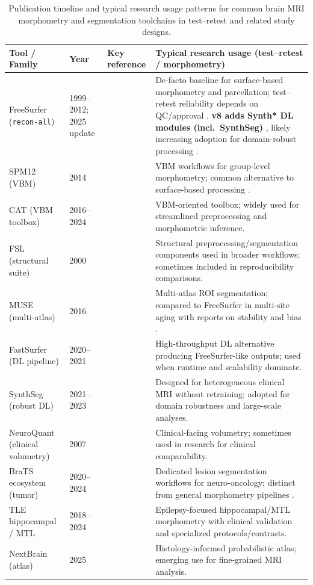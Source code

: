 \documentclass{midl} %
\begin{document}
\begin{table}[t]
\centering
\small
\setlength{\tabcolsep}{6pt}
\begin{tabular}{p{2.7cm} p{1.2cm} p{3.9cm} p{6.0cm}}
\hline
\textbf{Tool / Family} & \textbf{Year} & \textbf{Key reference} & \textbf{Typical research usage (test--retest / morphometry)} \\
\hline
FreeSurfer (\texttt{recon-all}) & 1999--2012; 2025 update
& \citet{Dale1999a,Fischl1999,Fischl2012,FreeSurferReleaseNotes8.0}
& De-facto baseline for surface-based morphometry and parcellation; test--retest reliability depends on QC/approval \citep{Iscan2015,FreeSurferMPRAGE2022}. \textbf{v8 adds Synth* DL modules (incl.\ SynthSeg)} \citep{FreeSurferReleaseNotes8.0}, likely increasing adoption for domain-robust processing \citep{Billot2023PNAS}. \\
SPM12 (VBM) & 2014 & \citet{SPM12} & VBM workflows for group-level morphometry; common alternative to surface-based processing \citep{Good2001}. \\
CAT (VBM toolbox) & 2016--2024 & \citet{Gaser2016,Gaser2024} & VBM-oriented toolbox; widely used for streamlined preprocessing and morphometric inference. \\
FSL (structural suite) & 2000 & \citet{FSL} & Structural preprocessing/segmentation components used in broader workflows; sometimes included in reproducibility comparisons. \\
MUSE (multi-atlas) & 2016 & \citet{Doshi2016} & Multi-atlas ROI segmentation; compared to FreeSurfer in multi-site aging with reports on stability and bias \citep{Srinivasan2020}. \\
FastSurfer (DL pipeline) & 2020--2021 & \citet{Henschel2020,henschel2022fastsurfervinn} & High-throughput DL alternative producing FreeSurfer-like outputs; used when runtime and scalability dominate. \\
SynthSeg (robust DL) & 2021--2023 & \citet{Billot2021,Billot2023,Billot2023PNAS} & Designed for heterogeneous clinical MRI without retraining; adopted for domain robustness and large-scale analyses. \\
NeuroQuant (clinical volumetry) & 2007 & \citet{NeuroQuant} & Clinical-facing volumetry; sometimes used in research for clinical comparability. \\
BraTS ecosystem (tumor) & 2020--2024 & \citet{BraTSToolkit2020,BraTS2024,BraTS2024Meningioma} & Dedicated lesion segmentation workflows for neuro-oncology; distinct from general morphometry pipelines \citep{Hasan2023}. \\
TLE hippocampal / MTL & 2018--2024 & \citet{TLESegmentation2018,Peixoto2024} & Epilepsy-focused hippocampal/MTL morphometry with clinical validation and specialized protocols/contrasts. \\
NextBrain (atlas) & 2025 & \citet{Casamitjana2025} & Histology-informed probabilistic atlas; emerging use for fine-grained MRI analysis. \\
\hline
\end{tabular}
\caption{Publication timeline and typical research usage patterns for common brain MRI morphometry and segmentation toolchains in test--retest and related study designs.}
\label{tab:tool_usage_timeline}
\end{table}
\end{document}
